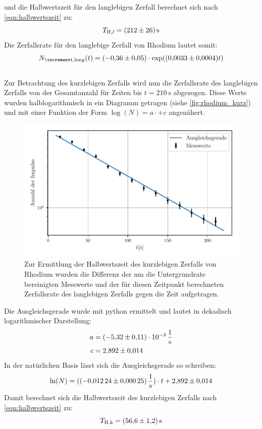 und die Halbwertszeit für den langlebigen Zerfall berechnet sich nach \eqref{eqn:halbwertszeit} zu:
\begin{equation*}
  T_{\text{H}, l} = \SI{212 \pm 26}{\second}
\end{equation*}
Die Zerfallsrate für den langlebige Zerfall von Rhodium lautet somit:
\begin{equation*}
  N_{\increment \text{t}, \text{lang}}(t) = (\num{-0.36 \pm 0.05})\cdot \exp((\num{0.0033 \pm 0.0004})t)
\end{equation*}
\\
Zur Betrachtung des kurzlebigen Zerfalls wird nun die Zerfallsrate des langlebigen Zerfalls von der Gesamtanzahl für Zeiten bis $t = \SI{210}{\second}$ abgezogen.
Diese Werte wurden halblogarithmisch in ein Diagramm getragen (siehe \autoref{fig:rhodium_kurz}) und mit einer Funktion der Form $\log(N) = a \cdot +c$ angenähert.
\begin{figure}[H]
  \centering
  \includegraphics[width=\textwidth]{build/rhodium_kurz.pdf}
  \caption{Zur Ermittlung der Halbwertszeit des kurzlebigen Zerfalls von Rhodium wurden die Differenz der um die Untergrundrate bereinigten Messwerte und der für diesen Zeitpunkt berechneten Zerfallsrate des langlebigen Zerfalls gegen die Zeit aufgetragen.}
  \label{fig:rhodium_kurz}
\end{figure}
Die Ausgleichsgerade wurde mit python ermittelt und lautet in dekadisch logarithmischer Darstellung:
\begin{align*}
  a &= \SI{-5.32(11)e-3}{\per\second}\\
  c &= \num{2.892 \pm 0.014}
\end{align*}
In der natürlichen Basis lässt sich die Ausgleichsgerade so schreiben:
\begin{equation*}
  \ln(N) = (\SI{-0.01224\pm 0.00025}{\per\second})\cdot t + \num{2.892\pm 0.014}
\end{equation*}
Damit berechnet sich die Halbwertszeit des kurzlebigen Zerfalls nach \eqref{eqn:halbwertszeit} zu:
\begin{equation*}
  T_{\text{H},\text{k}}= \SI{56.6\pm 1.2}{\second}
\end{equation*}

